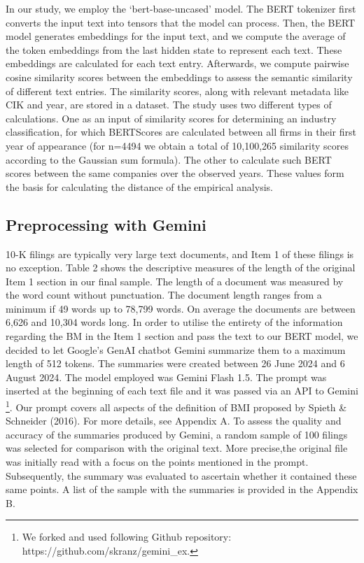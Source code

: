 \documentclass[
]{article}
\begin{document}
In our study, we employ the `bert-base-uncased' model. The BERT
tokenizer first converts the input text into tensors that the model can
process. Then, the BERT model generates embeddings for the input text,
and we compute the average of the token embeddings from the last hidden
state to represent each text. These embeddings are calculated for each
text entry. Afterwards, we compute pairwise cosine similarity scores
between the embeddings to assess the semantic similarity of different
text entries. The similarity scores, along with relevant metadata like
CIK and year, are stored in a dataset. The study uses two different
types of calculations. One as an input of similarity scores for
determining an industry classification, for which BERTScores are
calculated between all firms in their first year of appearance (for
n=4494 we obtain a total of 10,100,265 similarity scores according to
the Gaussian sum formula). The other to calculate such BERT scores
between the same companies over the observed years. These values form
the basis for calculating the distance of the empirical analysis.

\subsection{Preprocessing with Gemini}\label{preprocessing-with-gemini}

10-K filings are typically very large text documents, and Item 1 of
these filings is no exception. Table 2 shows the descriptive measures of
the length of the original Item 1 section in our final sample. The
length of a document was measured by the word count without punctuation.
The document length ranges from a minimum if 49 words up to 78,799
words. On average the documents are between 6,626 and 10,304 words long.
In order to utilise the entirety of the information regarding the BM in
the Item 1 section and pass the text to our BERT model, we decided to
let Google's GenAI chatbot Gemini summarize them to a maximum length of
512 tokens. The summaries were created between 26 June 2024 and 6 August
2024. The model employed was Gemini Flash 1.5. The prompt was inserted
at the beginning of each text file and it was passed via an API to
Gemini \footnote{We forked and used following Github repository:
  https://github.com/skranz/gemini\_ex.}. Our prompt covers all aspects
of the definition of BMI proposed by Spieth \& Schneider (2016). For
more details, see Appendix A. To assess the quality and accuracy of the
summaries produced by Gemini, a random sample of 100 filings was
selected for comparison with the original text. More precise,the
original file was initially read with a focus on the points mentioned in
the prompt. Subsequently, the summary was evaluated to ascertain whether
it contained these same points. A list of the sample with the summaries
is provided in the Appendix B.
\end{document}
